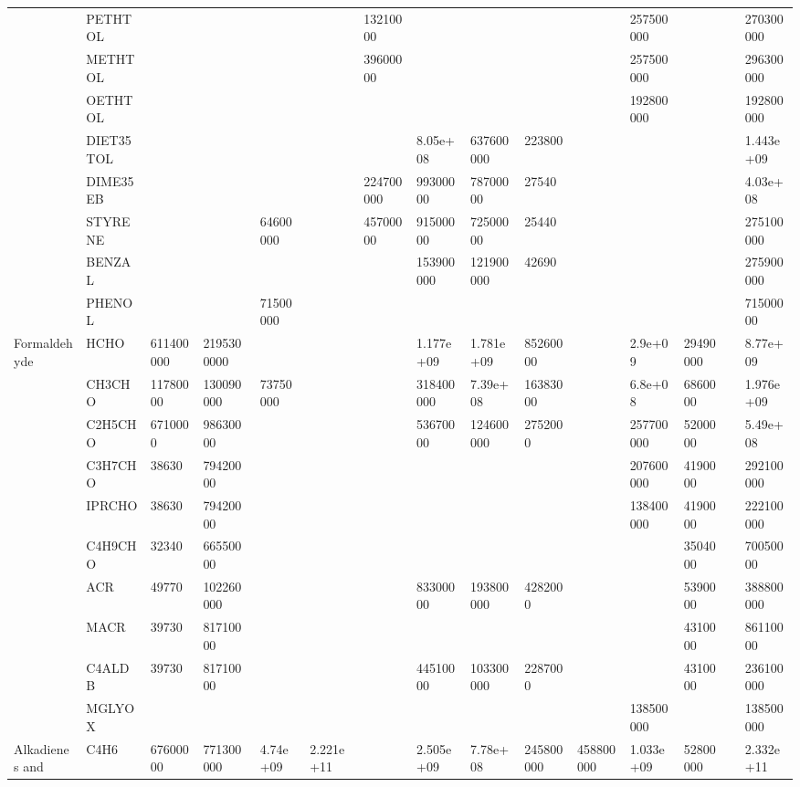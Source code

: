 \begin{longtable}{lllllllllllllll}
	 & PETHTOL &  &  &  &  & 13210000 &  &  &  &  & 257500000 &  &  & 270300000 \\
	 & METHTOL &  &  &  &  & 39600000 &  &  &  &  & 257500000 &  &  & 296300000 \\
	 & OETHTOL &  &  &  &  &  &  &  &  &  & 192800000 &  &  & 192800000 \\
	 & DIET35TOL &  &  &  &  &  & 8.05e+08 & 637600000 & 223800 &  &  &  &  & 1.443e+09 \\
	 & DIME35EB &  &  &  &  & 224700000 & 99300000 & 78700000 & 27540 &  &  &  &  & 4.03e+08 \\
	 & STYRENE &  &  & 64600000 &  & 45700000 & 91500000 & 72500000 & 25440 &  &  &  &  & 275100000 \\
	 & BENZAL &  &  &  &  &  & 153900000 & 121900000 & 42690 &  &  &  &  & 275900000 \\
	 & PHENOL &  &  & 71500000 &  &  &  &  &  &  &  &  &  & 71500000 \\
	\hline Formaldehyde & HCHO & 611400000 & 2195300000 &  &  &  & 1.177e+09 & 1.781e+09 & 85260000 &  & 2.9e+09 & 29490000 &  & 8.77e+09 \\ \hline
	\parbox[t]{2mm}{} & CH3CHO & 11780000 & 130090000 & 73750000 &  &  & 318400000 & 7.39e+08 & 16383000 &  & 6.8e+08 & 6860000 &  & 1.976e+09 \\
	 & C2H5CHO & 6710000 & 98630000 &  &  &  & 53670000 & 124600000 & 2752000 &  & 257700000 & 5200000 &  & 5.49e+08 \\
	 & C3H7CHO & 38630 & 79420000 &  &  &  &  &  &  &  & 207600000 & 4190000 &  & 292100000 \\
	 & IPRCHO & 38630 & 79420000 &  &  &  &  &  &  &  & 138400000 & 4190000 &  & 222100000 \\
	 & C4H9CHO & 32340 & 66550000 &  &  &  &  &  &  &  &  & 3504000 &  & 70050000 \\
	 & ACR & 49770 & 102260000 &  &  &  & 83300000 & 193800000 & 4282000 &  &  & 5390000 &  & 388800000 \\
	 & MACR & 39730 & 81710000 &  &  &  &  &  &  &  &  & 4310000 &  & 86110000 \\
	 & C4ALDB & 39730 & 81710000 &  &  &  & 44510000 & 103300000 & 2287000 &  &  & 4310000 &  & 236100000 \\
	 & MGLYOX &  &  &  &  &  &  &  &  &  & 138500000 &  &  & 138500000 \\
	\hline Alkadienes and & C4H6 & 67600000 & 771300000 & 4.74e+09 & 2.221e+11 &  & 2.505e+09 & 7.78e+08 & 245800000 & 458800000 & 1.033e+09 & 52800000 &  & 2.332e+11 \\

\end{longtable}
